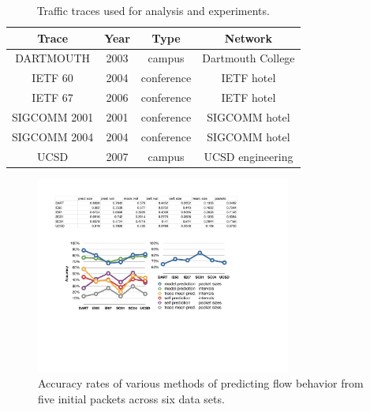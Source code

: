 \documentclass{acm_proc_article-sp}
\begin{document}
\begin{table}
\vspace{0.05em}
\begin{center}
\scriptsize
\begin{tabular}{|c|c|c|c|}

\hline
\textbf{Trace} &
\textbf{Year} &
\textbf{Type} &
\textbf{Network} \\
\hline

{\scriptsize{DARTMOUTH}} &
2003 &
campus &
Dartmouth College \\
\hline

{\scriptsize{IETF 60}} &
2004 &
conference &
IETF hotel \\
\hline

{\scriptsize{IETF 67}} &
2006 &
conference &
IETF hotel \\
\hline

{\scriptsize{SIGCOMM 2001}} &
2001 &
conference &
SIGCOMM hotel \\
\hline

{\scriptsize{SIGCOMM 2004}} &
2004 &
conference &
SIGCOMM hotel \\
\hline

{\scriptsize{UCSD}} &
2007 &
campus &
UCSD engineering \\
\hline

\end{tabular}
\caption{Traffic traces used for analysis and experiments.}
\end{center}
\vspace{-2em}
\end{table}

\begin{figure}[t]
\begin{center}
\includegraphics[width=3.3in]{pred_stats}
\caption{Accuracy rates of various methods of predicting flow behavior from five initial packets across six data sets.}
\end{center}
\vspace{-2em}
\end{figure}
\end{document}
